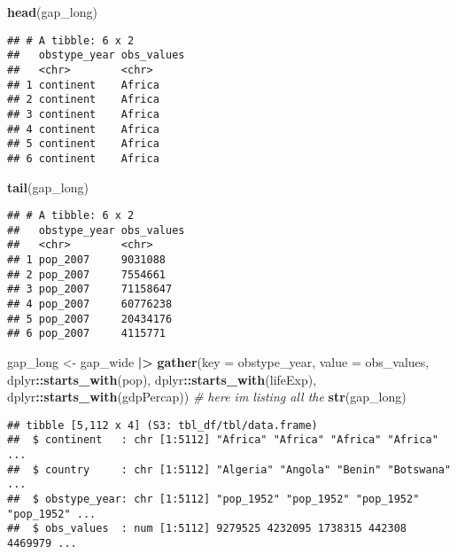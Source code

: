 \documentclass[
]{article}
\newenvironment{Shaded}{\begin{snugshade}}{\end{snugshade}}
\newcommand{\AttributeTok}[1]{\textcolor[rgb]{0.13,0.29,0.53}{#1}}
\newcommand{\CommentTok}[1]{\textcolor[rgb]{0.56,0.35,0.01}{\textit{#1}}}
\newcommand{\FunctionTok}[1]{\textcolor[rgb]{0.13,0.29,0.53}{\textbf{#1}}}
\newcommand{\NormalTok}[1]{#1}
\newcommand{\OtherTok}[1]{\textcolor[rgb]{0.56,0.35,0.01}{#1}}
\newcommand{\SpecialCharTok}[1]{\textcolor[rgb]{0.81,0.36,0.00}{\textbf{#1}}}
\newcommand{\StringTok}[1]{\textcolor[rgb]{0.31,0.60,0.02}{#1}}
\begin{document}
\begin{Shaded}
\begin{Highlighting}[]
\FunctionTok{head}\NormalTok{(gap\_long)}
\end{Highlighting}
\end{Shaded}

\begin{verbatim}
## # A tibble: 6 x 2
##   obstype_year obs_values
##   <chr>        <chr>     
## 1 continent    Africa    
## 2 continent    Africa    
## 3 continent    Africa    
## 4 continent    Africa    
## 5 continent    Africa    
## 6 continent    Africa
\end{verbatim}

\begin{Shaded}
\begin{Highlighting}[]
\FunctionTok{tail}\NormalTok{(gap\_long)}
\end{Highlighting}
\end{Shaded}

\begin{verbatim}
## # A tibble: 6 x 2
##   obstype_year obs_values
##   <chr>        <chr>     
## 1 pop_2007     9031088   
## 2 pop_2007     7554661   
## 3 pop_2007     71158647  
## 4 pop_2007     60776238  
## 5 pop_2007     20434176  
## 6 pop_2007     4115771
\end{verbatim}

\begin{Shaded}
\begin{Highlighting}[]
\NormalTok{gap\_long }\OtherTok{\textless{}{-}}\NormalTok{ gap\_wide }\SpecialCharTok{|\textgreater{}}
  \FunctionTok{gather}\NormalTok{(}\AttributeTok{key =}\NormalTok{ obstype\_year,}
        \AttributeTok{value =}\NormalTok{ obs\_values,}
\NormalTok{        dplyr}\SpecialCharTok{::}\FunctionTok{starts\_with}\NormalTok{(}\StringTok{\textquotesingle{}pop\textquotesingle{}}\NormalTok{),}
\NormalTok{        dplyr}\SpecialCharTok{::}\FunctionTok{starts\_with}\NormalTok{(}\StringTok{\textquotesingle{}lifeExp\textquotesingle{}}\NormalTok{),}
\NormalTok{        dplyr}\SpecialCharTok{::}\FunctionTok{starts\_with}\NormalTok{(}\StringTok{\textquotesingle{}gdpPercap\textquotesingle{}}\NormalTok{)) }\CommentTok{\# here i\textquotesingle{}m listing all the}
\FunctionTok{str}\NormalTok{(gap\_long)}
\end{Highlighting}
\end{Shaded}

\begin{verbatim}
## tibble [5,112 x 4] (S3: tbl_df/tbl/data.frame)
##  $ continent   : chr [1:5112] "Africa" "Africa" "Africa" "Africa" ...
##  $ country     : chr [1:5112] "Algeria" "Angola" "Benin" "Botswana" ...
##  $ obstype_year: chr [1:5112] "pop_1952" "pop_1952" "pop_1952" "pop_1952" ...
##  $ obs_values  : num [1:5112] 9279525 4232095 1738315 442308 4469979 ...
\end{verbatim}
\end{document}
